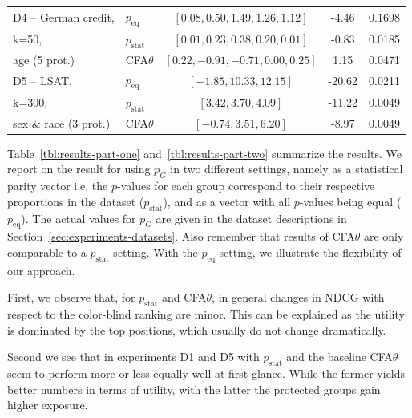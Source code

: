 \begin{table}[t!]
\begin{tabular}{llccc}
		\midrule
		D4 -- German credit, 	& \algoFAIR $p_{\text{eq}}$ 	&  $[0.08, 0.50, 1.49, 1.26, 1.12]$ 	& -4.46 	& 0.1698 \\
		k=50,  					& \algoFAIR $p_{\text{stat}}$ 	&  $[0.01, 0.23, 0.38, 0.20, 0.01]$		& -0.83 	& 0.0185 \\
		age (5 prot.) 			& CFA$\theta$ 					&  $[0.22, -0.91, -0.71, 0.00, 0.25]$ 	& 1.15 		& 0.0471 \\

		\midrule
		D5 -- LSAT, 			& \algoFAIR $p_{\text{eq}}$ 	& $[-1.85, 10.33, 12.15]$ 	& -20.62 	& 0.0211 \\
		k=300, 					& \algoFAIR $p_{\text{stat}}$ 	& $[3.42, 3.70, 4.09]$ 		& -11.22 	& 0.0049 \\
		sex \& race (3 prot.) 	& CFA$\theta$ 					& $[-0.74, 3.51, 6.20]$ 	& -8.97 	& 0.0049 \\

		\bottomrule
	\end{tabular}
\end{table}
%
Table~\ref{tbl:results-part-one} and~\ref{tbl:results-part-two} summarize the results.
%
We report on the result for \algoFAIR using $p_G$ in two different settings, namely as a statistical parity vector i.e. the $p$-values for each group correspond to their respective proportions in the dataset ($p_{\text{stat}}$), and as a vector with all $p$-values being equal ($p_{\text{eq}}$).
%
The actual values for $p_G$ are given in the dataset descriptions in Section~\ref{sec:experiments-datasets}.
%
Also remember that results of CFA$\theta$ are only comparable to a \algoFAIR $p_{\text{stat}}$ setting.
%
With the $p_{\text{eq}}$ setting, we illustrate the flexibility of our approach.

First, we observe that, for \algoFAIR $p_{\text{stat}}$ and CFA$\theta$, in general changes in NDCG with respect to the color-blind ranking are minor.
%
This can be explained as the utility is dominated by the top positions, which usually do not change dramatically.

Second we see that in experiments D1 and D5 \algoFAIR with $p_{\text{stat}}$ and the baseline CFA$\theta$ seem to perform more or less equally well at first glance.
%
While the former yields better numbers in terms of utility, with the latter the protected groups gain higher exposure.

